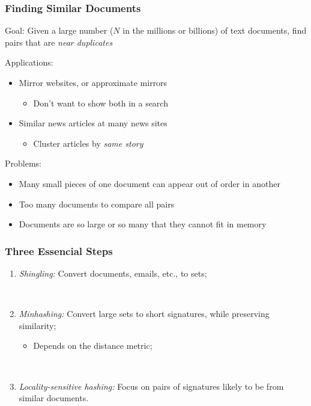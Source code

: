 \documentclass[svgnames]{beamer}
\begin{document}
\begin{frame} \frametitle{Finding Similar Documents}

\begin{block}{Goal:}
Given a large number ($N$ in the millions or billions) of text documents, find pairs that are \emph{near duplicates}
\end{block}

\begin{block}{Applications:}
  \scriptsize
  \begin{itemize}
  \item Mirror websites, or approximate mirrors
    \begin{itemize}\scriptsize
    \item Don’t want to show both in a search
    \end{itemize}
  \item Similar news articles at many news sites
    \begin{itemize}\scriptsize
    \item Cluster articles by \emph{same story}
    \end{itemize}
  \end{itemize}
\end{block}
\begin{block}{Problems:}
  \scriptsize
  \begin{itemize}
  \item Many small pieces of one document can appear out of order in another
  \item Too many documents to compare all pairs
  \item Documents are so large or so many that they cannot fit in memory
  \end{itemize}
\end{block}
\end{frame}

  
\begin{frame} \frametitle{Three Essencial Steps}

\begin{enumerate}
\item \emph{Shingling:} Convert documents, emails, etc., to sets;

~\\

\item \emph{Minhashing:} Convert large sets to short signatures, while preserving similarity;
   \begin{itemize}
   \item Depends on the distance metric;
   \end{itemize}

~\\

\item \emph{Locality-sensitive hashing:} Focus on pairs of signatures likely to be from similar documents.
\end{enumerate}

\end{frame}
\end{document}
